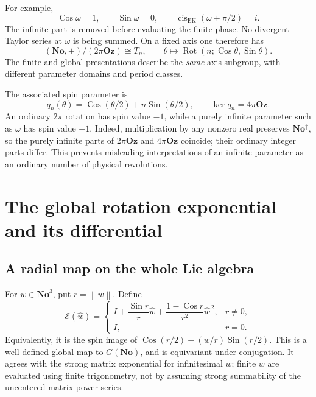 \documentclass[11pt,letterpaper]{article}
\numberwithin{equation}{section}
\theoremstyle{definition}
\theoremstyle{remark}
\newcommand{\No}{\mathbf{No}}
\newcommand{\Oz}{\mathbf{Oz}}
\newcommand{\cis}{\operatorname{cis}}
\newcommand{\Sin}{\operatorname{Sin}}
\newcommand{\Cos}{\operatorname{Cos}}
\newcommand{\Rot}{\operatorname{Rot}}
\newcommand{\norm}[1]{\left\lVert#1\right\rVert}
\begin{document}
For example,
\[
 \Cos\omega=1,\qquad\Sin\omega=0,\qquad
 \cis_{\mathrm{EK}}(\omega+\pi/2)=i.
\]
The infinite part is removed before evaluating the finite phase. No divergent
Taylor series at \(\omega\) is being summed. On a fixed axis one therefore has
\begin{equation}\label{e3:so:eq:globalaxisquotient}
 (\No,+)/(2\pi\Oz)\cong T_n,
 \qquad \theta\longmapsto \Rot(n;\Cos\theta,\Sin\theta).
\end{equation}
The finite and global presentations describe the \emph{same} axis subgroup,
with different parameter domains and period classes.

The associated spin parameter is
\[
 q_n(\theta)=\Cos(\theta/2)+n\Sin(\theta/2),
 \qquad \ker q_n=4\pi\Oz.
\]
An ordinary \(2\pi\) rotation has spin value \(-1\), while a purely infinite
parameter such as \(\omega\) has spin value \(+1\). Indeed, multiplication by
any nonzero real preserves \(\No^\uparrow\), so the purely infinite parts of
\(2\pi\Oz\) and \(4\pi\Oz\) coincide; their ordinary integer parts differ.
This prevents misleading interpretations of an infinite parameter as an
ordinary number of physical revolutions.

\section{The global rotation exponential and its differential}\label{e3:so:sec:globalexp}

\subsection{A radial map on the whole Lie algebra}

For \(w\in\No^3\), put \(r=\norm w\). Define
\begin{equation}\label{e3:so:eq:globalexp}
 \mathcal E(\widehat w)=
 \begin{cases}
 I+\dfrac{\Sin r}{r}\widehat w
   +\dfrac{1-\Cos r}{r^2}\widehat w^{\,2},&r\ne0,\\[6pt]
 I,&r=0.
 \end{cases}
\end{equation}
Equivalently, it is the spin image of
\(\Cos(r/2)+(w/r)\Sin(r/2)\). This is a well-defined global map to
\(G(\No)\), and is equivariant under conjugation. It agrees with the strong
matrix exponential for infinitesimal \(w\); finite \(w\) are evaluated using
finite trigonometry, not by assuming strong summability of the uncentered
matrix power series.
\end{document}
